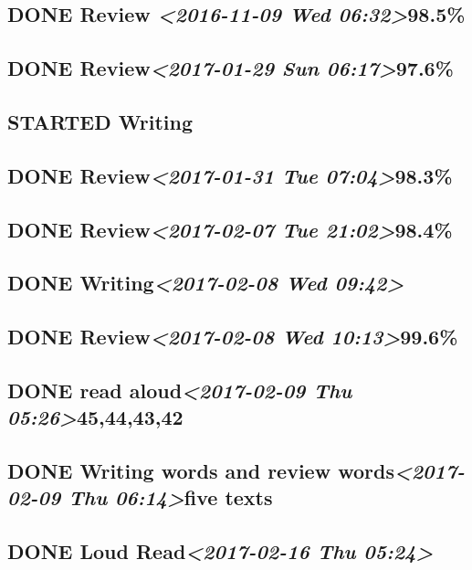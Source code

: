 \documentclass[11pt]{ctexart}
\begin{document}
\subsection{{\bfseries\sffamily DONE} Review \textit{<2016-11-09 Wed 06:32>}98.5\%}
\label{sec:org8415355}
\subsection{{\bfseries\sffamily DONE} Review\textit{<2017-01-29 Sun 06:17>}97.6\%}
\label{sec:org25db050}
\subsection{{\bfseries\sffamily STARTED} Writing}
\label{sec:org3bca5aa}
\subsection{{\bfseries\sffamily DONE} Review\textit{<2017-01-31 Tue 07:04>}98.3\%}
\label{sec:org70cd715}
\subsection{{\bfseries\sffamily DONE} Review\textit{<2017-02-07 Tue 21:02>}98.4\%}
\label{sec:org4ae949f}
\subsection{{\bfseries\sffamily DONE} Writing\textit{<2017-02-08 Wed 09:42>}}
\label{sec:orgbd73d1d}
\subsection{{\bfseries\sffamily DONE} Review\textit{<2017-02-08 Wed 10:13>}99.6\%}
\label{sec:org10894e8}
\subsection{{\bfseries\sffamily DONE} read aloud\textit{<2017-02-09 Thu 05:26>}45,44,43,42}
\label{sec:orgdc856db}
\subsection{{\bfseries\sffamily DONE} Writing words and review words\textit{<2017-02-09 Thu 06:14>}five texts}
\label{sec:org646b8e5}
\subsection{{\bfseries\sffamily DONE} Loud Read\textit{<2017-02-16 Thu 05:24>}}
\label{sec:org15251e9}
\end{document}
